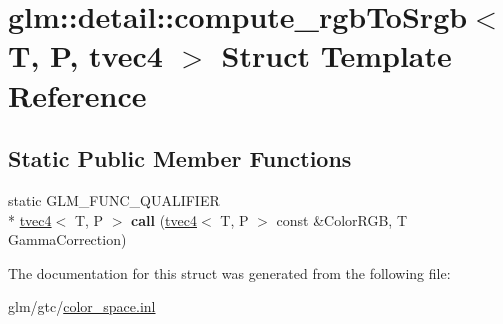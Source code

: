 \hypertarget{structglm_1_1detail_1_1compute__rgbToSrgb_3_01T_00_01P_00_01tvec4_01_4}{\section{glm\-:\-:detail\-:\-:compute\-\_\-rgb\-To\-Srgb$<$ T, P, tvec4 $>$ Struct Template Reference}
\label{structglm_1_1detail_1_1compute__rgbToSrgb_3_01T_00_01P_00_01tvec4_01_4}
}
\subsection*{Static Public Member Functions}
\begin{DoxyCompactItemize}
\item 
\hypertarget{structglm_1_1detail_1_1compute__rgbToSrgb_3_01T_00_01P_00_01tvec4_01_4_ae56f0243296dfc80da17770e0cab5edf}{static G\-L\-M\-\_\-\-F\-U\-N\-C\-\_\-\-Q\-U\-A\-L\-I\-F\-I\-E\-R \\*
\hyperlink{structglm_1_1tvec4}{tvec4}$<$ T, P $>$ {\bfseries call} (\hyperlink{structglm_1_1tvec4}{tvec4}$<$ T, P $>$ const \&Color\-R\-G\-B, T Gamma\-Correction)}\label{structglm_1_1detail_1_1compute__rgbToSrgb_3_01T_00_01P_00_01tvec4_01_4_ae56f0243296dfc80da17770e0cab5edf}

\end{DoxyCompactItemize}


The documentation for this struct was generated from the following file\-:\begin{DoxyCompactItemize}
\item 
glm/gtc/\hyperlink{gtc_2color__space_8inl}{color\-\_\-space.\-inl}\end{DoxyCompactItemize}
